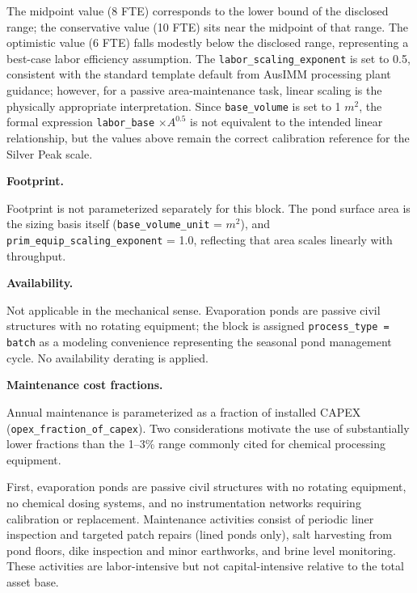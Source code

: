 \noindent The midpoint value (8 FTE) corresponds to the lower bound of the disclosed range; the conservative value (10 FTE) sits near the midpoint of that range. The optimistic value (6 FTE) falls modestly below the disclosed range, representing a best-case labor efficiency assumption. The \texttt{labor\_scaling\_exponent} is set to 0.5, consistent with the standard template default from AusIMM processing plant guidance; however, for a passive area-maintenance task, linear scaling is the physically appropriate interpretation. Since \texttt{base\_volume} is set to 1 $\si{m^2}$, the formal expression \texttt{labor\_base} $\times A^{0.5}$ is not equivalent to the intended linear relationship, but the values above remain the correct calibration reference for the Silver Peak scale.

\medskip
\noindent\textbf{Footprint.}\quad

Footprint is not parameterized separately for this block. The pond surface area is the sizing basis itself (\texttt{base\_volume\_unit} = $\si{m^2}$), and \texttt{prim\_equip\_scaling\_exponent} = 1.0, reflecting that area scales linearly with throughput.

\medskip
\noindent\textbf{Availability.}\quad

Not applicable in the mechanical sense. Evaporation ponds are passive civil structures with no rotating equipment; the block is assigned \texttt{process\_type = batch} as a modeling convenience representing the seasonal pond management cycle. No availability derating is applied.

\medskip
\noindent\textbf{Maintenance cost fractions.}\quad

Annual maintenance is parameterized as a fraction of installed CAPEX (\texttt{opex\_fraction\_of\_capex}). Two considerations motivate the use of substantially lower fractions than the 1--3\% range commonly cited for chemical processing equipment.
 
First, evaporation ponds are passive civil structures with no rotating equipment, no chemical dosing systems, and no instrumentation networks requiring calibration or replacement. Maintenance activities consist of periodic liner inspection and targeted patch repairs (lined ponds only), salt harvesting from pond floors, dike inspection and minor earthworks, and brine level monitoring. These activities are labor-intensive but not capital-intensive relative to the total asset base.
 
